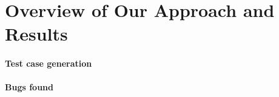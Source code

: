 \section{Overview of Our Approach and Results}\label{sec:overview}


\paragraph{Test case generation} 


\paragraph{Bugs found} 